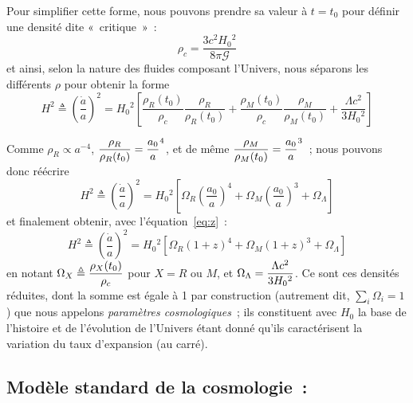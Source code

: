 \documentclass[../main/main.tex]{subfiles}
\begin{document}
Pour simplifier cette forme, nous pouvons prendre sa valeur à $t = t_0$ pour
définir une densité dite «~critique~»~:
\begin{equation}
    \rho_c = \frac{3c^2H_0{}^2}{8\pi\mathcal{G}}
\end{equation}
et ainsi, selon la nature des fluides composant l'Univers, nous séparons les
différents $\rho$ pour obtenir la forme
\begin{equation}
    H^2 \triangleq \left( \frac{\dot{a}}{a} \right)^2 =
    H_0{}^2 \left[ \frac{\rho_R(t_0)}{\rho_c}\frac{\rho_R}{\rho_R(t_0)} +
                   \frac{\rho_M(t_0)}{\rho_c}\frac{\rho_M}{\rho_M(t_0)} +
                   \frac{\Lambda c^2}{3 H_0{}^2}
               \right]
\end{equation}

Comme $\rho_R \propto a^{-4}$, $\displaystyle\frac{\rho_R}{\rho_R(t_0)} = \frac{a_0}{a}^4$,
et de même $\displaystyle\frac{\rho_M}{\rho_M(t_0)} = \frac{a_0}{a}^3$~; nous pouvons
donc réécrire
\begin{equation}
    H^2 \triangleq \left( \frac{\dot{a}}{a} \right)^2 =
        H_0{}^2 \left[ \Omega_R \left( \frac{a_0}{a} \right)^4 +
                       \Omega_M \left( \frac{a_0}{a} \right)^3 +
                       \Omega_\Lambda \right]
\end{equation}
et finalement obtenir, avec l'équation~\ref{eq:z}~:
\begin{equation}\label{eq:h2}
    H^2 \triangleq \left( \frac{\dot{a}}{a} \right)^2 =
        H_0{}^2 \left[ \Omega_R \left( 1+z \right)^4 +
                       \Omega_M \left( 1+z \right)^3 +
                       \Omega_\Lambda \right]
\end{equation}
en notant $\Omega_X \triangleq \displaystyle \frac{\rho_X(t_0)}{\rho_c}$ pour $X = R$ ou
$M$, et $\Omega_\Lambda = \displaystyle \frac{\Lambda c^2}{3 H_0{}^2}$. Ce sont ces
densités réduites, dont la somme est égale à 1 par construction (autrement dit,
$\sum_i \Omega_i = 1$) que nous appelons \textit{paramètres cosmologiques}~; ils
constituent avec $H_0$ la base de l'histoire et de l'évolution de l'Univers
étant donné qu'ils caractérisent la variation du taux d'expansion (au carré).

\subsection{Modèle standard de la cosmologie~: \lcdm}\label{sec:MS}
\end{document}
